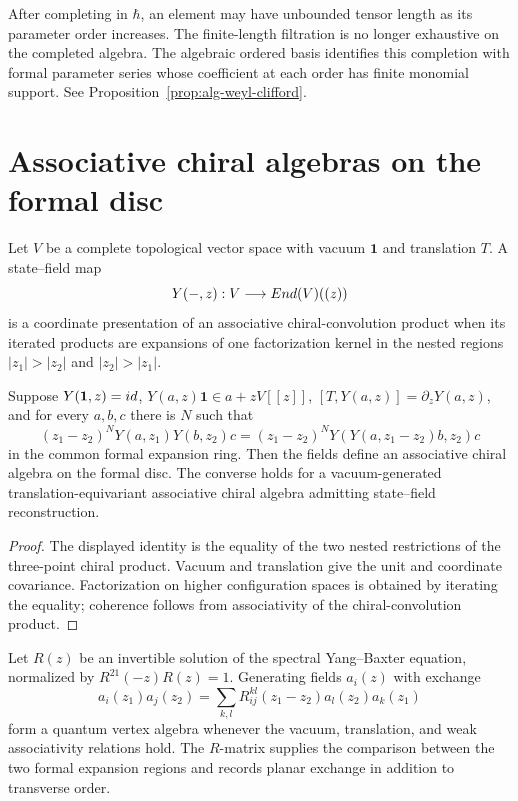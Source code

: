 After completing in $\hbar$, an element may have unbounded tensor length as its parameter order increases.
The finite-length filtration is no longer exhaustive on the completed algebra.
The algebraic ordered basis identifies this completion with formal parameter series whose coefficient at each order has finite monomial support. See Proposition~\ref{prop:alg-weyl-clifford}.


\chapter{Associative chiral algebras on the formal disc}
Let $V$ be a complete topological vector space with vacuum $\mathbf1$ and translation $T$.  A state--field map
\[
 Y(-,z):V\longrightarrow End(V)((z))
\]
is a coordinate presentation of an associative chiral-convolution product when its iterated products are expansions of one factorization kernel in the nested regions $|z_1|>|z_2|$ and $|z_2|>|z_1|$.

\begin{proposition}
Suppose $Y(\mathbf1,z)=id$, $Y(a,z)\mathbf1\in a+zV[[z]]$, $[T,Y(a,z)]=\partial_zY(a,z)$, and for every $a,b,c$ there is $N$ such that
\[
 (z_1-z_2)^N Y(a,z_1)Y(b,z_2)c
 =(z_1-z_2)^N Y(Y(a,z_1-z_2)b,z_2)c
\]
in the common formal expansion ring.  Then the fields define an associative chiral algebra on the formal disc.  The converse holds for a vacuum-generated translation-equivariant associative chiral algebra admitting state--field reconstruction.
\end{proposition}
\begin{proof}
The displayed identity is the equality of the two nested restrictions of the three-point chiral product.  Vacuum and translation give the unit and coordinate covariance.  Factorization on higher configuration spaces is obtained by iterating the equality; coherence follows from associativity of the chiral-convolution product.
\end{proof}

\begin{example}
Let $R(z)$ be an invertible solution of the spectral Yang--Baxter equation, normalized by $R^{21}(-z)R(z)=1$.  Generating fields $a_i(z)$ with exchange
\[
 a_i(z_1)a_j(z_2)
 =\sum_{k,l}R_{ij}^{kl}(z_1-z_2)a_l(z_2)a_k(z_1)
\]
form a quantum vertex algebra whenever the vacuum, translation, and weak associativity relations hold.  The $R$-matrix supplies the comparison between the two formal expansion regions and records planar exchange in addition to transverse order.
\end{example}

